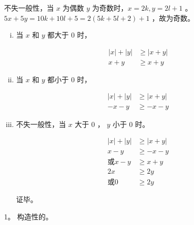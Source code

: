 {{        %
        \begin{practices}
            不失一般性，当 $x$ 为偶数 $y$ 为奇数时，$x = 2k, y = 2l + 1$ 。
            $5x + 5y = 10k + 10l +5 = 2(5k + 5l + 2) + 1$ ，故为奇数。
        \end{practices}

        \begin{practices}
            \begin{enumerate}[i.]
                \item
                {
                    当 $x$ 和 $y$ 都大于 $0$ 时，

                    \begin{align*}
                        |x| + |y| &\geq |x + y| \\
                        x + y &\geq x + y
                    \end{align*}
                }
                \item
                {
                    当 $x$ 和 $y$ 都小于 $0$ 时，

                    \begin{align*}
                        |x| + |y| &\geq |x + y| \\
                        -x - y &\geq -x - y
                    \end{align*}
                }
                \item
                {
                    不失一般性，当 $x$ 大于 $0$ ， $y$ 小于 $0$ 时。

                    \begin{align*}
                        |x| + |y| &\geq |x + y| \\
                        x - y &\geq -x - y \\
                        \text{或} x - y &\geq x + y \\
                        2x &\geq 2y \\
                        \text{或} 0 &\geq 2y
                    \end{align*}
                }

                证毕。
            \end{enumerate}
        \end{practices}

        \begin{practices}
            1。
            构造性的。
        \end{practices}

}}
